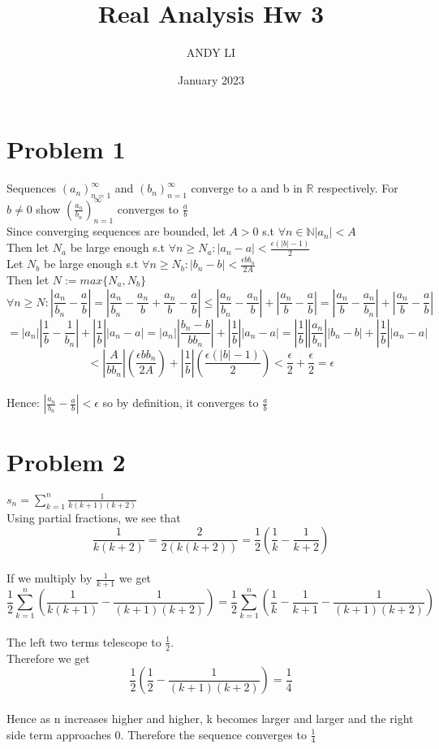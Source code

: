 \documentclass{article}
\title{Real Analysis Hw 3}
\author{ANDY LI}
\date{January 2023}
\begin{document}
\maketitle
\section*{Problem 1}
Sequences $(a_n)_{n=1}^{\infty}$ and $(b_n)_{n=1}^{\infty}$ converge to a and b in $\mathbb{R}$ respectively. For $b \neq 0$ show $(\frac{a_n}{b_n})_{n=1}^{\infty}$ converges to $\frac{a}{b}$
\\Since converging sequences are bounded, let $A > 0$ s.t $\forall n \in \mathbb{N} |a_n| < A$
\\Then let $N_a$ be large enough s.t $\forall n \geq N_a : |a_n - a| < \frac{\epsilon(|b|-1)}{2}$
\\Let $N_b$ be large enough s.t $\forall n \geq N_b : |b_n - b| < \frac{\epsilon bb_n}{2A}$
\\Then let $N := max\{N_a, N_b\}$ \\$$\forall n \geq N : |\frac{a_n}{b_n} - \frac{a}{b}| = |\frac{a_n}{b_n} - \frac{a_n}{b} + \frac{a_n}{b} - \frac{a}{b}| \leq |\frac{a_n}{b_n} - \frac{a_n}{b}| + |\frac{a_n}{b} - \frac{a}{b}|  = |\frac{a_n}{b} - \frac{a_n}{b_n}| + |\frac{a_n}{b} - \frac{a}{b}|$$
$$ = |a_n||\frac{1}{b} - \frac{1}{b_n}| + |\frac{1}{b}||a_n - a| = |a_n||\frac{b_n - b}{bb_n}|+|\frac{1}{b}||a_n-a| = |\frac{1}{b}||\frac{a_n}{b_n}||b_n-b| + |\frac{1}{b}||a_n-a|$$
$$< |\frac{A}{bb_n}|(\frac{\epsilon bb_n}{2A}) + |\frac{1}{b}|(\frac{\epsilon(|b| - 1)}{2}) < \frac{\epsilon}{2} + \frac{\epsilon}{2} = \epsilon$$
\\Hence: $|\frac{a_n}{b_n} - \frac{a}{b}| < \epsilon$ so by definition, it converges to $\frac{a}{b}$

\section*{Problem 2}
$s_n = \sum_{k=1}^{n} \frac{1}{k(k+1)(k+2)}$
\\Using partial fractions, we see that $$\frac{1}{k(k+2)} = \frac{2}{2(k(k+2))} = \frac{1}{2}(\frac{1}{k} - \frac{1}{k+2})$$
\\If we multiply by $\frac{1}{k+1}$ we get $$\frac{1}{2} \sum_{k=1}^{n}(\frac{1}{k(k+1)} - \frac{1}{(k+1)(k+2)}) = \frac{1}{2} \sum_{k=1}^{n}(\frac{1}{k} - \frac{1}{k+1} - \frac{1}{(k+1)(k+2)}) $$
\\The left two terms telescope to $\frac{1}{2}$.
\\Therefore we get $$\frac{1}{2}(\frac{1}{2} - \frac{1}{(k+1)(k+2)}) = \frac{1}{4}$$
\\Hence as n increases higher and higher, k becomes larger and larger and the right side term approaches 0. Therefore the sequence converges to $\frac{1}{4}$
\end{document}
